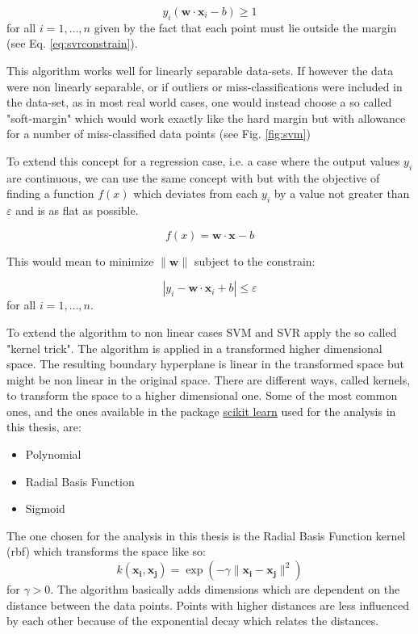 \begin{equation}\label{eq:svmconstrain}
y_{i}({\mathbf {w}}\cdot {\mathbf {x}}_{i}-b)\geq 1
\end{equation}
for all $i=1,\ldots ,n$ given by the fact that each point must lie outside the margin (see Eq. \ref{eq:svrconstrain}).

This algorithm works well for linearly separable data-sets. If however the data were non linearly separable, or if outliers or miss-classifications were included in the data-set, as in most real  world cases, one would instead choose a so called "soft-margin" which would work exactly like the hard margin but with allowance for a number of miss-classified data points (see Fig. \ref{fig:svm})

To extend this concept for a regression case, i.e. a case where the output values $y_{i}$ are continuous, we can use the same concept with but with the objective of finding a function $f(x)$ which deviates from each $y_{i}$ by a value not greater than $\varepsilon$ and is as flat as possible.

\begin{equation}\label{eq:svr}
f(x) = \mathbf {w}\cdot \mathbf {x}-b
\end{equation}

This would mean to minimize $\|{\mathbf {w}}\|$ subject to the constrain:

\begin{equation}\label{eq:svrconstrain}
|y_{i} - {\mathbf {w}}\cdot {\mathbf {x}}_{i}+b|\leq \varepsilon
\end{equation}
for all $i=1,\ldots ,n$.

To extend the algorithm to non linear cases SVM and SVR apply the so called "kernel trick". The algorithm is applied in a transformed higher dimensional space. The resulting boundary hyperplane is linear in the transformed space but might be non linear in the original space.
There are different ways, called kernels, to transform the space to a higher dimensional one. Some of the most common ones, and the ones available in the package \href{https://scikit-learn.org/}{scikit learn} used for the analysis in this thesis, are:
\begin{itemize}
	\item Polynomial
	\item Radial Basis Function
	\item Sigmoid
\end{itemize} 

The one chosen for the analysis in this thesis is the Radial Basis Function kernel (rbf) which transforms the space like so:
\begin{equation}\label{eq:rbf}
k({\mathbf {x_{i}}},{\mathbf {x_{j}}})=\exp(-\gamma \|\mathbf {x_{i}}-\mathbf {x_{j}}\|^{2})
\end{equation}
for $\gamma >0$.
The algorithm basically adds dimensions which are dependent on the distance between the data points. Points with higher distances are less influenced by each other because of the exponential decay which relates the distances.

